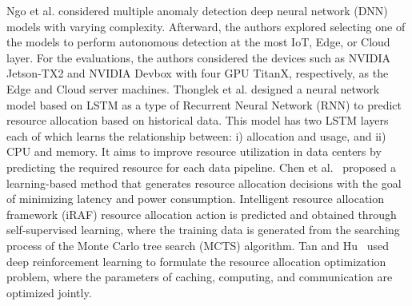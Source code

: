         Ngo et al. \cite{ngoContextualbanditAnomalyDetection2020} considered multiple anomaly detection deep neural network (DNN) models with varying complexity. Afterward, the authors explored selecting one of the models to perform autonomous detection at the most IoT, Edge, or Cloud layer. For the evaluations, the authors considered the devices such as NVIDIA Jetson-TX2 and NVIDIA Devbox with four GPU TitanX, respectively, as the Edge and Cloud server machines.
        Thonglek et al. \cite{thonglekImprovingResourceUtilization2019} designed a neural network model based on LSTM as a type of Recurrent Neural Network (RNN) to predict resource allocation based on historical data. This model has two LSTM layers each of which learns the relationship between: i) allocation and usage, and ii) CPU and memory. It aims to improve resource utilization in data centers by predicting the required resource for each data pipeline.
        Chen et al.~\cite{chenIRAFDeepReinforcement2019,chenIntelligentTaskOffloading2020} proposed a learning-based method that generates resource allocation decisions with the goal of minimizing latency and power consumption. Intelligent resource allocation framework (iRAF) resource allocation action is predicted and obtained through self-supervised learning, where the training data is generated from the searching process of the Monte Carlo tree search (MCTS) algorithm.
        Tan and Hu~\cite{huMobilityawareEdgeCaching2018} used deep reinforcement learning to formulate the resource allocation optimization problem, where the parameters of caching, computing, and communication are optimized jointly.


    


            